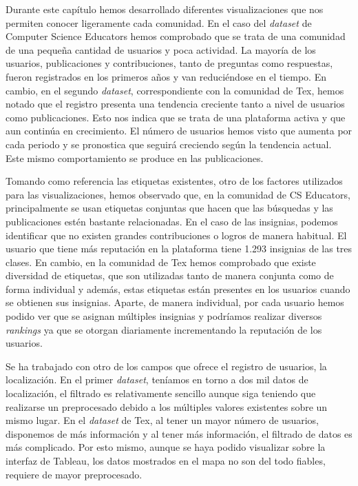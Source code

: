 \documentclass[a4paper, 12pt]{book}
\begin{document}
Durante este capítulo hemos desarrollado diferentes visualizaciones que nos permiten conocer ligeramente cada comunidad. En el caso del \textit{dataset} de Computer Science Educators hemos comprobado que se trata de una comunidad de una pequeña cantidad de usuarios y poca actividad. La mayoría de los usuarios, publicaciones y contribuciones, tanto de preguntas como respuestas, fueron registrados en los primeros años y van reduciéndose en el tiempo. En cambio, en el segundo \textit{dataset}, correspondiente con la comunidad de Tex, hemos notado que el registro presenta una tendencia creciente tanto a nivel de usuarios como publicaciones. Esto nos indica que se trata de una plataforma activa y que aun continúa en crecimiento. El número de usuarios hemos visto que aumenta por cada periodo y se pronostica que seguirá creciendo según la tendencia actual. Este mismo comportamiento se produce en las publicaciones.

Tomando como referencia las etiquetas existentes, otro de los factores utilizados para las visualizaciones, hemos observado que, en la comunidad de CS Educators, principalmente se usan etiquetas conjuntas que hacen que las búsquedas y las publicaciones estén bastante relacionadas. En el caso de las insignias, podemos identificar que no existen grandes contribuciones o logros de manera habitual. El usuario que tiene más reputación en la plataforma tiene 1.293 insignias de las tres clases.
En cambio, en la comunidad de Tex hemos comprobado que existe diversidad de etiquetas, que son utilizadas tanto de manera conjunta como de forma individual y además, estas etiquetas están presentes en los usuarios cuando se obtienen sus insignias. Aparte, de manera individual, por cada usuario hemos podido ver que se asignan múltiples insignias y podríamos realizar diversos \emph{rankings} ya que se otorgan diariamente incrementando la reputación de los usuarios. 

Se ha trabajado con otro de los campos que ofrece el registro de usuarios, la localización. En el primer \textit{dataset}, teníamos en torno a dos mil datos de localización, el filtrado es relativamente sencillo aunque siga teniendo que realizarse un preprocesado debido a los múltiples valores existentes sobre un mismo lugar.  En el \textit{dataset} de Tex, al tener un mayor número de usuarios, disponemos de más información y al tener más información, el filtrado de datos es más complicado. Por esto mismo, aunque se haya podido visualizar sobre la interfaz de Tableau, los datos mostrados en el mapa no son del todo fiables, requiere de mayor preprocesado. 
\end{document}
